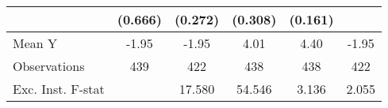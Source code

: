 {\begin{tabular}{l*{5}{c}}
            &     (0.666)         &     (0.272)         &     (0.308)         &     (0.161)         &                     \\
\midrule
Mean Y      &       -1.95         &       -1.95         &        4.01         &        4.40         &       -1.95         \\
Observations&         439         &         422         &         438         &         438         &         422         \\
Exc. Inst. F-stat&                     &      17.580         &      54.546         &       3.136         &       2.055         \\
\bottomrule
\end{tabular}
}

